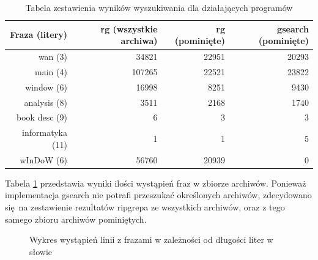 \begin{table}[h]
    \centering
    \begin{tabular}{|r|r|r|r|}
        \hline
        \textbf{Fraza (litery)} & \textbf{rg (wszystkie archiwa)} & \textbf{rg (pominięte)} &  \textbf{gsearch (pominięte)} \\
        \hline
        wan (3) & 34821 & 22951 & 20293 \\
        \hline
        main (4) & 107265 & 22521 & 23822 \\
        \hline
        window (6) & 16998 & 8251 & 9430 \\
        \hline
        analysis (8) & 3511 & 2168 & 1740 \\
        \hline
        book desc (9) & 6 & 3 & 3 \\
        \hline
        informatyka (11) & 1 & 1 & 5 \\
        \hline
        wInDoW (6) & 56760 & 20939 & 0 \\
        \hline
    \end{tabular}
    \caption{Tabela zestawienia wyników wyszukiwania dla działających programów}
    \label{tabela:iloscWyszukanDziekiProgramom}
\end{table}

Tabela \ref{tabela:iloscWyszukanDziekiProgramom} przedstawia wyniki ilości 
wystąpień fraz w zbiorze archiwów. Ponieważ implementacja gsearch nie potrafi
przeszukać określonych archiwów, zdecydowano się na zestawienie rezultatów
ripgrepa ze wszystkich archiwów, oraz z tego samego zbioru archiwów pominiętych. 

\begin{figure}[ht]
    \centering
    \caption{Wykres wystąpień linii z frazami w zależności od długości liter w słowie }
    \label{fig:wykresPorównaniaIlosciWystapień}
\end{figure}

